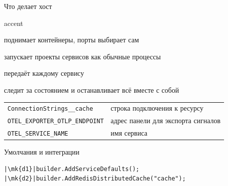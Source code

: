 \documentclass[aspectratio=169,10pt,t]{beamer}
\newcommand{\codesm}{\ttfamily\fontsize{7.6}{9.0}\selectfont}
\newcommand{\mk}[1]{\tikz[remember picture,overlay]\coordinate (#1) at (0,0.55ex);}
\begin{document}
\begin{frame}{Что делает хост}
  \slidetop

  \begin{cbul}{accent}
    \item поднимает контейнеры, порты выбирает сам
    \item запускает проекты сервисов как обычные процессы
    \item передаёт каждому сервису 
    \item следит за состоянием и останавливает всё вместе с собой
  \end{cbul}

  \slidegap
  {\renewcommand{\arraystretch}{1.2}\small
  \begin{tabular}{@{}L{6.2cm}L{7.0cm}@{}}
    \texttt{ConnectionStrings\_\_cache}        & строка подключения к ресурсу \\
    \texttt{OTEL\_EXPORTER\_OTLP\_ENDPOINT}    & адрес панели для экспорта сигналов \\
    \texttt{OTEL\_SERVICE\_NAME}               & имя сервиса \\
  \end{tabular}}
\end{frame}

\begin{frame}[fragile]{Умолчания и интеграции}
  \slidetop
\begin{lstlisting}[style=csharp,basicstyle=\codesm,escapechar=|]
|\mk{d1}|builder.AddServiceDefaults();
|\mk{d2}|builder.AddRedisDistributedCache("cache");
\end{lstlisting}

  \slidegap
\end{frame}
\end{document}
